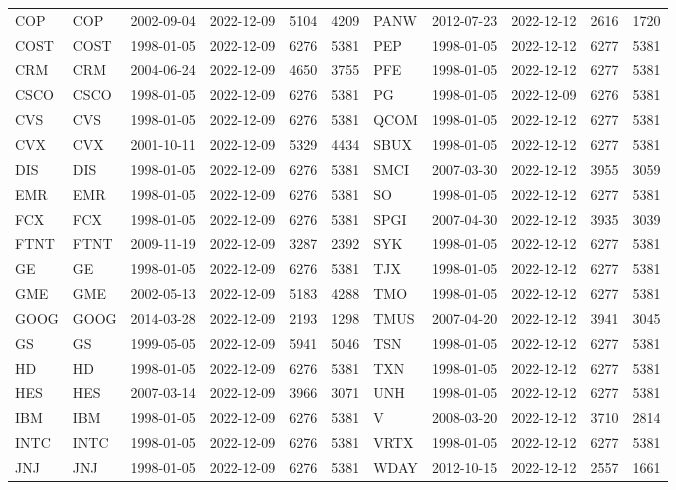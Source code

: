 \begin{table}[ht]
\begin{tabular}{llllrrlllrr}
  COP & COP & 2002-09-04 & 2022-12-09 & 5104 & 4209 & PANW & 2012-07-23 & 2022-12-12 & 2616 & 1720 \\ 
  COST & COST & 1998-01-05 & 2022-12-09 & 6276 & 5381 & PEP & 1998-01-05 & 2022-12-12 & 6277 & 5381 \\ 
  CRM & CRM & 2004-06-24 & 2022-12-09 & 4650 & 3755 & PFE & 1998-01-05 & 2022-12-12 & 6277 & 5381 \\ 
  CSCO & CSCO & 1998-01-05 & 2022-12-09 & 6276 & 5381 & PG & 1998-01-05 & 2022-12-09 & 6276 & 5381 \\ 
  CVS & CVS & 1998-01-05 & 2022-12-09 & 6276 & 5381 & QCOM & 1998-01-05 & 2022-12-12 & 6277 & 5381 \\ 
  CVX & CVX & 2001-10-11 & 2022-12-09 & 5329 & 4434 & SBUX & 1998-01-05 & 2022-12-12 & 6277 & 5381 \\ 
  DIS & DIS & 1998-01-05 & 2022-12-09 & 6276 & 5381 & SMCI & 2007-03-30 & 2022-12-12 & 3955 & 3059 \\ 
  EMR & EMR & 1998-01-05 & 2022-12-09 & 6276 & 5381 & SO & 1998-01-05 & 2022-12-12 & 6277 & 5381 \\ 
  FCX & FCX & 1998-01-05 & 2022-12-09 & 6276 & 5381 & SPGI & 2007-04-30 & 2022-12-12 & 3935 & 3039 \\ 
  FTNT & FTNT & 2009-11-19 & 2022-12-09 & 3287 & 2392 & SYK & 1998-01-05 & 2022-12-12 & 6277 & 5381 \\ 
  GE & GE & 1998-01-05 & 2022-12-09 & 6276 & 5381 & TJX & 1998-01-05 & 2022-12-12 & 6277 & 5381 \\ 
  GME & GME & 2002-05-13 & 2022-12-09 & 5183 & 4288 & TMO & 1998-01-05 & 2022-12-12 & 6277 & 5381 \\ 
  GOOG & GOOG & 2014-03-28 & 2022-12-09 & 2193 & 1298 & TMUS & 2007-04-20 & 2022-12-12 & 3941 & 3045 \\ 
  GS & GS & 1999-05-05 & 2022-12-09 & 5941 & 5046 & TSN & 1998-01-05 & 2022-12-12 & 6277 & 5381 \\ 
  HD & HD & 1998-01-05 & 2022-12-09 & 6276 & 5381 & TXN & 1998-01-05 & 2022-12-12 & 6277 & 5381 \\ 
  HES & HES & 2007-03-14 & 2022-12-09 & 3966 & 3071 & UNH & 1998-01-05 & 2022-12-12 & 6277 & 5381 \\ 
  IBM & IBM & 1998-01-05 & 2022-12-09 & 6276 & 5381 & V & 2008-03-20 & 2022-12-12 & 3710 & 2814 \\ 
  INTC & INTC & 1998-01-05 & 2022-12-09 & 6276 & 5381 & VRTX & 1998-01-05 & 2022-12-12 & 6277 & 5381 \\ 
  JNJ & JNJ & 1998-01-05 & 2022-12-09 & 6276 & 5381 & WDAY & 2012-10-15 & 2022-12-12 & 2557 & 1661 \\ 

\end{tabular}
\end{table}
